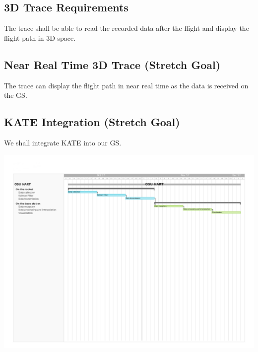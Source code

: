 \documentclass[onecolumn, draftclsnofoot,10pt, compsoc]{IEEEtran}
\begin{document}
\subsection{3D Trace Requirements}
The trace shall be able to read the recorded data after the flight
and display the flight path in 3D space.
\subsection{Near Real Time 3D Trace (Stretch Goal)}
The trace can display the flight path in near
real time as the data is received on the GS.
\subsection{KATE Integration (Stretch Goal)}
We shall integrate KATE into our GS.

\includegraphics[width=\textwidth,height=\textheight]{gantt}
\end{document}
